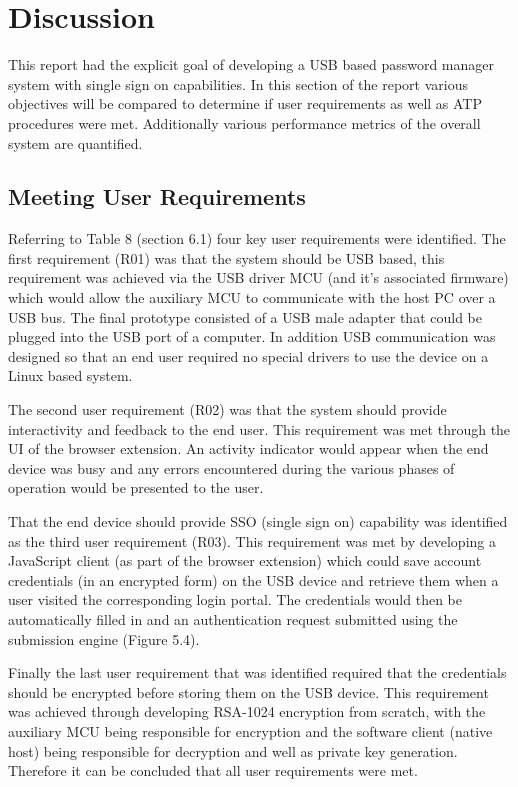 \section{Discussion}
This report had the explicit goal of developing a USB based password manager system with single sign on capabilities. In this section of the report various objectives will be compared to determine if user requirements as well as ATP procedures were met. Additionally various performance metrics of the overall system are quantified.

\subsection{Meeting User Requirements}
 Referring to Table 8 (section 6.1) four key user requirements were identified. The first requirement (R01) was that the system should be USB based, this requirement was achieved via the USB driver MCU (and it's associated firmware) which would allow the auxiliary MCU to communicate with the host PC over a USB bus. The final prototype consisted of a USB male adapter that could be plugged into the USB port of a computer. In addition USB communication was designed so that an end user required no special drivers to use the device on a Linux based system.
 
 The second user requirement (R02) was that the system should provide interactivity and feedback to the end user. This requirement was met through the UI of the browser extension. An activity indicator would appear when the end device was busy and any errors encountered during the various phases of operation would be presented to the user.
 
 That the end device should provide SSO (single sign on) capability was identified as the third user requirement (R03). This requirement was met by developing a JavaScript client (as part of the browser extension) which could save account credentials (in an encrypted form) on the USB device and retrieve them when a user visited the corresponding login portal. The credentials would then be automatically filled in and an authentication request submitted using the submission engine (Figure 5.4).
 
 Finally the last user requirement that was identified required that the credentials should be encrypted before storing them on the USB device. This requirement was achieved through developing RSA-1024 encryption from scratch, with the auxiliary MCU being responsible for encryption and the software client (native host) being responsible for decryption and well as private key generation. Therefore it can be concluded that all user requirements were met.
 

